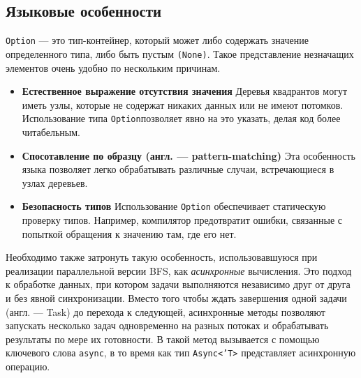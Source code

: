 \subsection{Языковые особенности \fsharp}
\noindent \texttt{Option} --- это тип-контейнер, который может либо содержать значение определенного типа, либо быть пустым \texttt{(None)}. Такое представление незначащих элементов очень удобно по нескольким причинам.
\begin{itemize}
\item{\textbf{Естественное выражение отсутствия значения}} \newline
Деревья квадрантов могут иметь узлы, которые не содержат никаких данных или не имеют потомков. Использование типа \texttt{Option}позволяет явно на это указать, делая код более читабельным.
\item{\textbf{Спосотавление по образцу (англ. --- pattern-matching)}} \newline
Эта особенность языка позволяет легко обрабатывать различные случаи, встречающиеся в узлах деревьев.
\item{\textbf{Безопасность типов}} \newline
Использование \texttt{Option} обеспечивает статическую проверку типов. Например, компилятор предотвратит ошибки, связанные с попыткой обращения к значению там, где его нет.
\end{itemize}


Необходимо также затронуть такую особенность, использовавшуюся при реализации параллельной версии BFS, как \textit{асинхронные} вычисления. Это подход к обработке данных, при котором задачи выполняются независимо друг от друга и без явной синхронизации. Вместо того чтобы ждать завершения одной задачи (англ. --- Task) до перехода к следующей, асинхронные методы позволяют запускать несколько задач одновременно на разных потоках и обрабатывать результаты по мере их готовности. В \fsharp такой метод вызывается с помощью ключевого слова \texttt{async}, в то время как тип \texttt{Async<'T>} представляет асинхронную операцию.